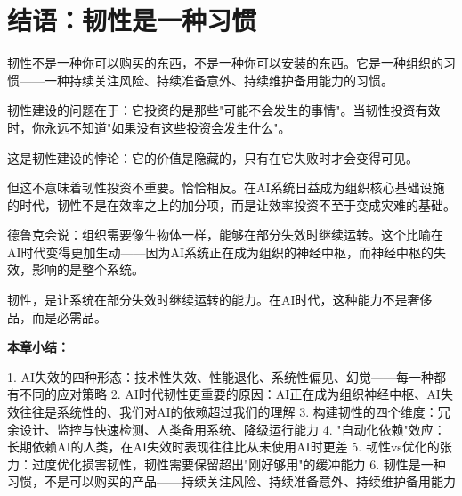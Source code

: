 \section{结语：韧性是一种习惯}


韧性不是一种你可以购买的东西，不是一种你可以安装的东西。它是一种组织的习惯——一种持续关注风险、持续准备意外、持续维护备用能力的习惯。

韧性建设的问题在于：它投资的是那些"可能不会发生的事情"。当韧性投资有效时，你永远不知道"如果没有这些投资会发生什么"。

这是韧性建设的悖论：它的价值是隐藏的，只有在它失败时才会变得可见。

但这不意味着韧性投资不重要。恰恰相反。在AI系统日益成为组织核心基础设施的时代，韧性不是在效率之上的加分项，而是让效率投资不至于变成灾难的基础。

德鲁克会说：组织需要像生物体一样，能够在部分失效时继续运转。这个比喻在AI时代变得更加生动——因为AI系统正在成为组织的神经中枢，而神经中枢的失效，影响的是整个系统。

韧性，是让系统在部分失效时继续运转的能力。在AI时代，这种能力不是奢侈品，而是必需品。


\textbf{本章小结：}

1. AI失效的四种形态：技术性失效、性能退化、系统性偏见、幻觉——每一种都有不同的应对策略
2. AI时代韧性更重要的原因：AI正在成为组织神经中枢、AI失效往往是系统性的、我们对AI的依赖超过我们的理解
3. 构建韧性的四个维度：冗余设计、监控与快速检测、人类备用系统、降级运行能力
4. "自动化依赖"效应：长期依赖AI的人类，在AI失效时表现往往比从未使用AI时更差
5. 韧性vs优化的张力：过度优化损害韧性，韧性需要保留超出"刚好够用"的缓冲能力
6. 韧性是一种习惯，不是可以购买的产品——持续关注风险、持续准备意外、持续维护备用能力
